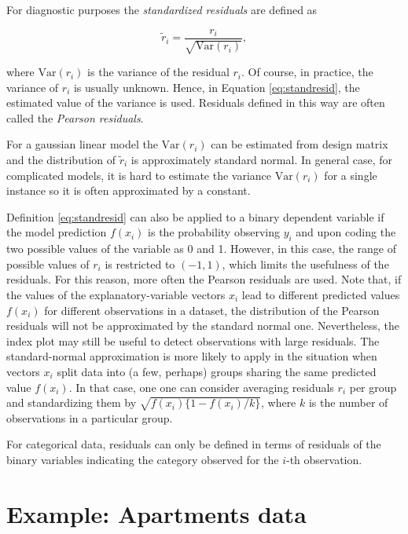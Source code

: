 \documentclass[]{krantz}
\begin{document}
For diagnostic purposes the \emph{standardized residuals} are defined as

\begin{equation}
\tilde{r}_i = \frac{r_i}{\sqrt{\mbox{Var}(r_i)}},
\label{eq:standresid}
\end{equation}

where \(\mbox{Var}(r_i)\) is the variance of the residual \(r_i\).
Of course, in practice, the variance of \(r_i\) is usually unknown. Hence, in Equation \eqref{eq:standresid}, the estimated value of the variance is used. Residuals defined in this way are often called the \emph{Pearson residuals}.

For a gaussian linear model the \(\mbox{Var}(r_i)\) can be estimated from design matrix and the distribution of \(\tilde{r}_i\) is approximately standard normal. In general case, for complicated models, it is hard to estimate the variance \(\mbox{Var}(r_i)\) for a single instance so it is often approximated by a constant.

Definition \eqref{eq:standresid} can also be applied to a binary dependent variable if the model prediction \(f(x_i)\) is the probability observing \(y_i\) and upon coding the two possible values of the variable as 0 and 1. However, in this case, the range of possible values of \(r_i\) is restricted to \((-1,1)\), which limits the usefulness of the residuals. For this reason, more often the Pearson residuals are used. Note that, if the values of the explanatory-variable vectors \(x_i\) lead to different predicted values \(f(x_i)\) for different observations in a dataset, the distribution of the Pearson residuals will not be approximated by the standard normal one. Nevertheless, the index plot may still be useful to detect observations with large residuals. The standard-normal approximation is more likely to apply in the situation when vectors \(x_i\) split data into (a few, perhaps) groups sharing the same predicted value \(f(x_i)\). In that case, one one can consider averaging residuals \(r_i\) per group and standardizing them by \(\sqrt{f(x_i)\{1-f(x_i)/k\}}\), where \(k\) is the number of observations in a particular group.

For categorical data, residuals can only be defined in terms of residuals of the binary variables indicating the category observed for the \(i\)-th observation.

\hypertarget{ExampleResidualDiagnostic}{%
\section{Example: Apartments data}\label{ExampleResidualDiagnostic}}
\end{document}

